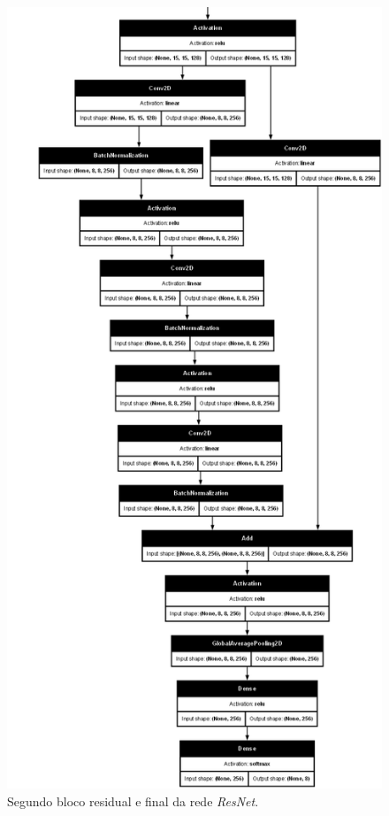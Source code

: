\documentclass[final,5p]{elsarticle}
\numberwithin{equation}{section}
\begin{document}
        \begin{figure}[H]
            \includegraphics[width=0.95\columnwidth]{ResNet_model_lower.png}
            \caption{Segundo bloco residual e final da rede \emph{ResNet}.}\label{fig:ModeloCNNlower}
        \end{figure}
\end{document}
